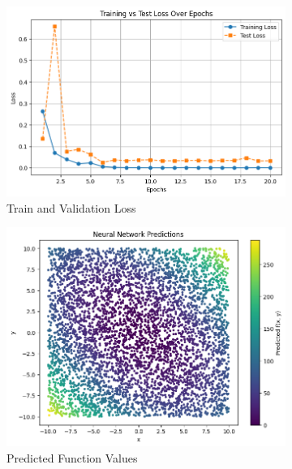 \documentclass{article}
\begin{document}
\begin{figure}[ht]
  \centering
  \begin{subfigure}{0.3\textwidth}
    \includegraphics[width=\textwidth]{images/q2_train_test_loss.png}
    \caption{Train and Validation Loss}
    \label{fig:train_val_loss_1}
  \end{subfigure}
  \hspace{0.5cm}
  \begin{subfigure}{0.3\textwidth}
    \includegraphics[width=\textwidth]{images/q2_data_dist_pred.png}
    \caption{Predicted Function Values}
  \end{subfigure}
  \hspace{0.5cm}
  \begin{subfigure}{0.3\textwidth}

\end{subfigure}
\end{figure}
\end{document}
